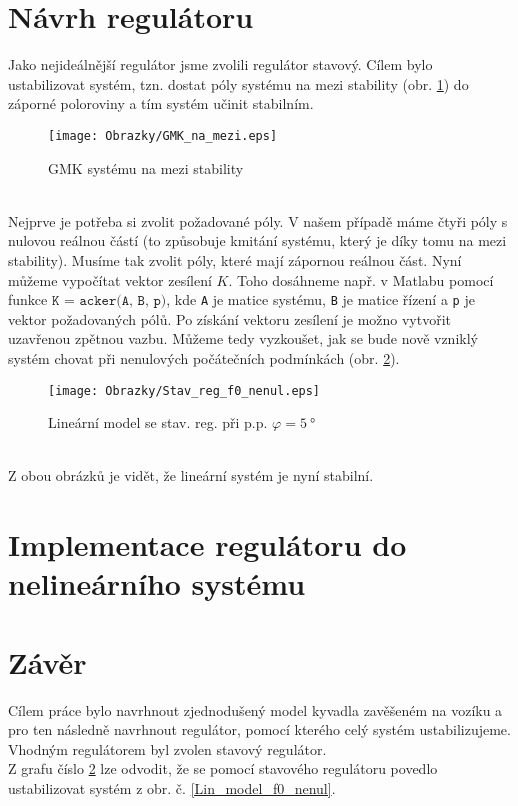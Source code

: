 \documentclass[a4paper, 12pt]{article}
\begin{document}
	\section{Návrh regulátoru}
		Jako nejideálnější regulátor jsme zvolili regulátor stavový. Cílem bylo ustabilizovat systém, tzn. dostat póly systému na mezi stability (obr. \ref{GMK_na_mezi}) do záporné poloroviny a tím systém učinit stabilním.	
		\begin{figure}[h]
			\begin{center}
				\texttt{[image: Obrazky/GMK\_na\_mezi.eps]}
				\label{GMK_na_mezi}
				\caption{GMK systému na mezi stability}
			\end{center}
		\end{figure}
		\\Nejprve je potřeba si zvolit požadované póly. V našem případě máme čtyři póly s nulovou reálnou částí (to způsobuje kmitání systému, který je díky tomu na mezi stability). Musíme tak zvolit póly, které mají zápornou reálnou část. Nyní můžeme vypočítat vektor zesílení $K$. Toho dosáhneme např. v Matlabu pomocí funkce $\texttt{K = acker(A, B, p)}$, kde \texttt{A} je matice systému, \texttt{B} je matice řízení a \texttt{p} je vektor požadovaných pólů. 
		Po získání vektoru zesílení je možno vytvořit uzavřenou zpětnou vazbu. Můžeme tedy vyzkoušet, jak se bude nově vzniklý systém chovat při nenulových počátečních podmínkách (obr. \ref{Stav_reg_f0_nenul}).
		\begin{figure}[h]
			\begin{center}
				\texttt{[image: Obrazky/Stav\_reg\_f0\_nenul.eps]}
				\label{Stav_reg_f0_nenul}
				\caption{Lineární model se stav. reg. při p.p. $\varphi = \SI{5}{\degree}$}
			\end{center}
		\end{figure}
		\\Z obou obrázků je vidět, že lineární systém je nyní stabilní.
		\clearpage
	\section{Implementace regulátoru do nelineárního systému}
	\section{Závěr}
		Cílem práce bylo navrhnout zjednodušený model kyvadla zavěšeném na vozíku a pro ten následně navrhnout regulátor, pomocí kterého celý systém ustabilizujeme. Vhodným regulátorem byl zvolen stavový regulátor.\\
		Z grafu číslo \ref{Stav_reg_f0_nenul} lze odvodit, že se pomocí stavového regulátoru povedlo ustabilizovat systém z obr. č. \ref{Lin_model_f0_nenul}.
\end{document}

